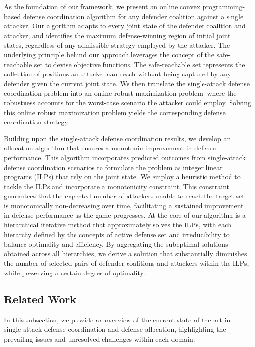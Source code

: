 \documentclass[journal]{IEEEtran}
\newcommand{\1}{\mathbf{1}}
\begin{document}
As the foundation of our framework, we present an online convex programming-based defense coordination algorithm for any defender coalition against a single attacker. Our algorithm adapts to every joint state of the defender coalition and attacker, and identifies the maximum defense-winning region of initial joint states, regardless of any admissible strategy employed by the attacker. The underlying principle behind our approach leverages the concept of the safe-reachable set to devise objective functions. The safe-reachable set represents the collection of positions an attacker can reach without being captured by any defender given the current joint state. We then translate the single-attack defense coordination problem into an online robust maximization problem, where the robustness accounts for the worst-case scenario the attacker could employ. Solving this online robust maximization problem yields the corresponding defense coordination strategy. 

Building upon the single-attack defense coordination results, we develop an allocation algorithm that ensures a monotonic improvement in defense performance. This algorithm incorporates predicted outcomes from single-attack defense coordination scenarios to formulate the problem as integer linear programs (ILPs) that rely on the joint state. We employ a heuristic method to tackle the ILPs and incorporate a monotonicity constraint. This constraint guarantees that the expected number of attackers unable to reach the target set is monotonically non-decreasing over time, facilitating a sustained improvement in defense performance as the game progresses. At the core of our algorithm is a hierarchical iterative method that approximately solves the ILPs, with each hierarchy defined by the concepts of active defense set and irreducibility to balance optimality and efficiency. By aggregating the suboptimal solutions obtained across all hierarchies, we derive a solution that substantially diminishes the number of selected pairs of defender coalitions and attackers within the ILPs, while preserving a certain degree of optimality. 

\subsection{Related Work}

In this subsection, we provide an overview of the current state-of-the-art in single-attack defense coordination and defense allocation, highlighting the prevailing issues and unresolved challenges within each domain.
\end{document}
